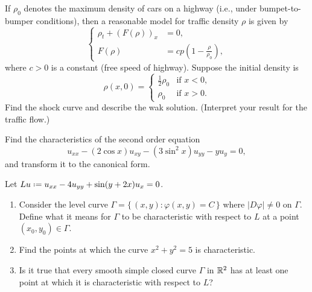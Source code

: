 \begin{problem}
  If \(\rho_0\) denotes the maximum density of cars on a highway (i.e.,
  under bumpet-to-bumper conditions), then a reasonable model for traffic
  density \(\rho\) is given by
  \[
     \left\{
       \begin{aligned}
         \rho_t+(F(\rho))_x&=0,\\
         F(\rho)&=cp\left(1-\frac{\rho}{\rho_0}\right),
      \end{aligned}
    \right.
  \]
  where \(c>0\) is a constant (free speed of highway). Suppose the initial
  density is
  \[
    \rho(x,0)=
    \begin{cases}
      \frac{1}{2}\rho_0&\text{if \(x<0\),}\\
      \rho_0&\text{if \(x>0\).}
    \end{cases}
  \]
  Find the shock curve and describe the wak solution. (Interpret your
  result for the traffic flow.)
\end{problem}
\begin{solution*}
\end{solution*}

\begin{problem}
  Find the characteristics of the second order equation
  \[
    u_{xx}-(2\cos x)u_{xy}-(3\sin^2 x)u_{yy}-yu_y=0,
  \]
  and transform it to the canonical form.
\end{problem}
\begin{solution*}
\end{solution*}

\begin{problem}
  Let \(Lu\defeq u_{xx}-4u_{yy}+\sin(y+2x)u_{x}=0\).
  \begin{enumerate}[label=(\alph*),noitemsep]
  \item Consider the level curve \(\Gamma=\{\,(x,y):\varphi(x,y)=C\,\}\)
    where \(|D\varphi|\neq 0\) on \(\Gamma\). Define what it means for
    \(\Gamma\) to be characteristic with respect to \(L\) at a point
    \((x_0,y_0)\in\Gamma\).
  \item Find the points at which the curve \(x^2+y^2=5\) is
    characteristic.
  \item Is it true that every smooth simple closed curve \(\Gamma\) in
    \(\mathbb{R}^2\) has at least one point at which it is characteristic with
    respect to \(L\)?
  \end{enumerate}
\end{problem}
\begin{solution*}
\end{solution*}

